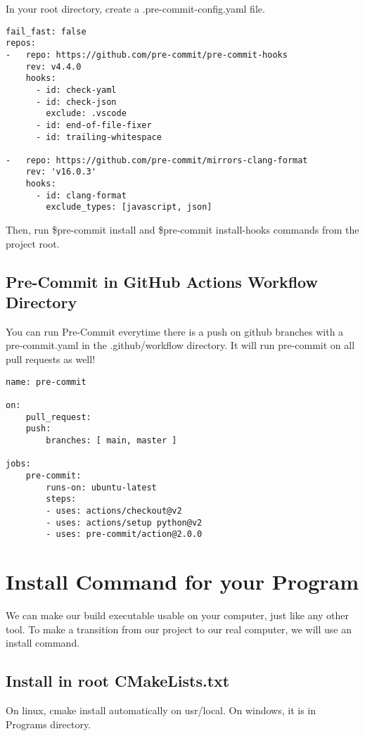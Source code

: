 In your root directory, create a .pre-commit-config.yaml file.

\begin{verbatim}
fail_fast: false
repos:
-   repo: https://github.com/pre-commit/pre-commit-hooks
    rev: v4.4.0
    hooks:
      - id: check-yaml
      - id: check-json
        exclude: .vscode
      - id: end-of-file-fixer
      - id: trailing-whitespace

-   repo: https://github.com/pre-commit/mirrors-clang-format
    rev: 'v16.0.3'
    hooks:
      - id: clang-format
        exclude_types: [javascript, json]
\end{verbatim}

Then, run \$pre-commit install and \$pre-commit install-hooks commands from the project root.


\subsection{Pre-Commit in GitHub Actions Workflow Directory}

You can run Pre-Commit everytime there is a push on github branches with a pre-commit.yaml in the .github/workflow 
directory. It will run pre-commit on all pull requests as well!

\begin{verbatim}
name: pre-commit

on:
    pull_request:
    push:
        branches: [ main, master ]

jobs:
    pre-commit:
        runs-on: ubuntu-latest
        steps:
        - uses: actions/checkout@v2
        - uses: actions/setup python@v2
        - uses: pre-commit/action@2.0.0
\end{verbatim}


\section{Install Command for your Program}

We can make our build executable usable on your computer, just like any other tool. To make a transition from 
our project to our real computer, we will use an install command.


\subsection{Install in root CMakeLists.txt}

On linux, cmake install automatically on usr/local. On windows, it is in Programs directory.

